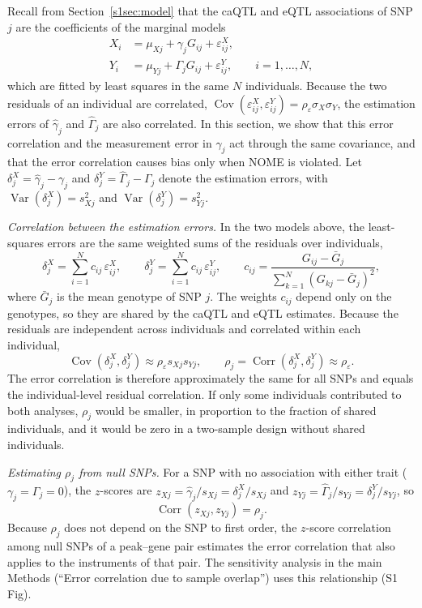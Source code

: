 \noindent Recall from Section~\ref{s1sec:model} that the caQTL and eQTL associations of SNP $j$ are the coefficients of the marginal models
\begin{align*}
X_i &= \mu_{Xj} + \gamma_j G_{ij} + \varepsilon_{ij}^{X}, \\
Y_i &= \mu_{Yj} + \Gamma_j G_{ij} + \varepsilon_{ij}^{Y}, \qquad i=1,\ldots,N,
\end{align*}
which are fitted by least squares in the same $N$ individuals. Because the two residuals of an individual are correlated, $\operatorname{Cov}(\varepsilon_{ij}^{X},\varepsilon_{ij}^{Y})=\rho_\varepsilon\sigma_X\sigma_Y$, the estimation errors of $\hat{\gamma}_j$ and $\hat{\Gamma}_j$ are also correlated. In this section, we show that this error correlation and the measurement error in $\hat{\gamma}_j$ act through the same covariance, and that the error correlation causes bias only when NOME is violated. Let $\delta^X_j=\hat{\gamma}_j-\gamma_j$ and $\delta^Y_j=\hat{\Gamma}_j-\Gamma_j$ denote the estimation errors, with $\operatorname{Var}(\delta^X_j)=s_{Xj}^2$ and $\operatorname{Var}(\delta^Y_j)=s_{Yj}^2$.

\noindent \textit{Correlation between the estimation errors.} In the two models above, the least-squares errors are the same weighted sums of the residuals over individuals,
\begin{equation*}
\delta^X_j=\sum_{i=1}^{N}c_{ij}\,\varepsilon^X_{ij},
\qquad
\delta^Y_j=\sum_{i=1}^{N}c_{ij}\,\varepsilon^Y_{ij},
\qquad
c_{ij}=\frac{G_{ij}-\bar{G}_j}{\sum_{k=1}^{N}(G_{kj}-\bar{G}_j)^2},
\end{equation*}
where $\bar{G}_j$ is the mean genotype of SNP $j$. The weights $c_{ij}$ depend only on the genotypes, so they are shared by the caQTL and eQTL estimates. Because the residuals are independent across individuals and correlated within each individual,
\begin{equation*}
\operatorname{Cov}(\delta^X_j,\delta^Y_j)\approx\rho_\varepsilon s_{Xj}s_{Yj},
\qquad
\rho_j=\operatorname{Corr}(\delta^X_j,\delta^Y_j)\approx\rho_\varepsilon .
\end{equation*}
The error correlation is therefore approximately the same for all SNPs and equals the individual-level residual correlation. If only some individuals contributed to both analyses, $\rho_j$ would be smaller, in proportion to the fraction of shared individuals, and it would be zero in a two-sample design without shared individuals.

\noindent \textit{Estimating $\rho_j$ from null SNPs.} For a SNP with no association with either trait ($\gamma_j=\Gamma_j=0$), the $z$-scores are $z_{Xj}=\hat{\gamma}_j/s_{Xj}=\delta^X_j/s_{Xj}$ and $z_{Yj}=\hat{\Gamma}_j/s_{Yj}=\delta^Y_j/s_{Yj}$, so
\begin{equation*}
\operatorname{Corr}(z_{Xj},z_{Yj})=\rho_j .
\end{equation*}
Because $\rho_j$ does not depend on the SNP to first order, the $z$-score correlation among null SNPs of a peak--gene pair estimates the error correlation that also applies to the instruments of that pair. The sensitivity analysis in the main Methods (``Error correlation due to sample overlap'') uses this relationship (S1 Fig).

